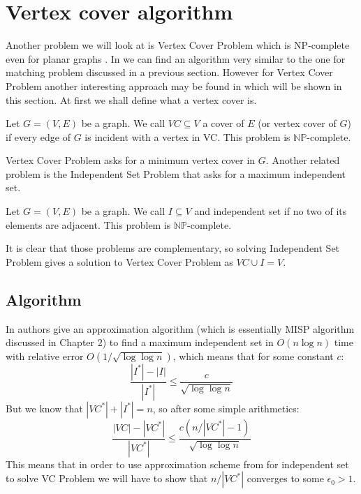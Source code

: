 \section{Vertex cover algorithm}
Another problem we will look at is Vertex Cover Problem which is NP-complete
even for planar graphs
\cite{gareyJohnsonStockmeyer1976, cormenIntroductionAlgorithms2022}. In
\cite{chibaApplicationsLiptonTarjans1981} we can find an algorithm very similar
to the one for matching problem discussed in a previous section. However for
Vertex Cover Problem another interesting approach may be found in
\cite{bar-yehudaApproximatingVertexCover1982} which will be shown in this
section.
At first we shall define what a vertex cover is.
\begin{defn} \label{def:vertex-cover}
    Let $G = (V, E)$ be a graph. We call $VC \subseteq V$ a cover of $E$ (or 
    vertex cover of $G$) if every edge of $G$ is incident with a vertex in VC.
    This problem is $\mathbb{N}\mathbb{P}$-complete.
\end{defn}
Vertex Cover Problem asks for a minimum vertex cover in $G$. Another related problem is the
Independent Set Problem that asks for a maximum independent set.
\begin{defn}
    Let $G = (V, E)$ be a graph. We call $I \subseteq V$ and independent set if no 
    two of its elements are adjacent. This problem is $\mathbb{N}\mathbb{P}$-complete.
\end{defn}
It is clear that those problems are complementary, so solving Independent Set Problem
gives a solution to Vertex Cover Problem as $VC \cup I = V$. 
\subsection{Algorithm}
In \cite{liptonApplicationsPlanarSeparator1977}
authors give an approximation algorithm (which is essentially \textsc{MISP} algorithm discussed in Chapter 2) to find
a maximum independent set in $O(n \log n)$ time with
relative error $O(1/\sqrt{\log \log n})$, which means that for some constant $c$:
$$
\frac{|I^*| - |I|}{|I^*|} \leq \frac{c}{\sqrt{\log \log n}}
$$
But we know that $|VC^*| + |I^*| = n$, so after some simple arithmetics:
$$
\frac{|VC| - |VC^*|}{|VC^*|} \leq \frac{c (n/|VC^*| - 1)}{\sqrt{\log \log n}}
$$
This means that in order to use approximation scheme from \cite{liptonApplicationsPlanarSeparator1977}
for independent set to solve VC Problem we will have to show that $n/|VC^*|$ converges
to some $\epsilon_0 > 1$.


